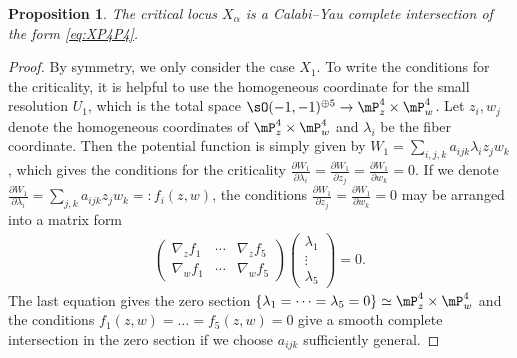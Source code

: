 \documentclass[pdftex]{sigma}
\numberwithin{equation}{section}
\newtheorem{Proposition}[Theorem]{Proposition}
\begin{document}
\begin{Proposition}The critical locus $X_{\alpha}$ is a Calabi--Yau complete intersection of the form \eqref{eq:XP4P4}.
\end{Proposition}
\begin{proof} By symmetry, we only consider the case $X_{1}$. To write the conditions for the criticality, it is helpful to use the homogeneous coordinate for the small resolution $U_{1}$, which is the total space $\sO(-1,-1)^{\oplus5}\to\mP_{z}^{4}\times\mP_{w}^{4}$. Let $z_{i},w_{j}$ denote the homogeneous coordinates of $\mP_{z}^{4}\times\mP_{w}^{4}$ and $\lambda_{i}$ be the fiber coordinate. Then the potential function is simply given by $W_{1}=\sum_{i,j,k}a_{ijk}\lambda_{i}z_{j}w_{k}$, which gives the conditions for the criticality $\frac{\partial W_{1}}{\partial\lambda_{i}}=\frac{\partial W_{1}}{\partial z_{j}}=\frac{\partial W_{1}}{\partial w_{k}}=0$. If we denote $\frac{\partial W_{1}}{\partial\lambda_{i}}=\sum_{j,k}a_{ijk}z_{j}w_{k}=:f_{i}(z,w)$, the conditions $\frac{\partial W_{1}}{\partial z_{j}}=\frac{\partial W_{1}}{\partial w_{k}}=0$ may be arranged into a matrix form
\begin{gather*}
\left(\begin{matrix}\nabla_{z}f_{1} & \cdots & \nabla_{z}f_{5}\\
\nabla_{w}f_{1} & \cdots & \nabla_{w}f_{5}
\end{matrix}\right)\left(\begin{smallmatrix}\lambda_{1}\\
\vdots\\
\lambda_{5}
\end{smallmatrix}\right)=0.
\end{gather*}
The last equation gives the zero section $\left\{ \lambda_{1}=\cdots=\lambda_{5}=0\right\} \simeq\mP_{z}^{4}\times\mP_{w}^{4}$
and the conditions $f_{1}(z,w)=\dots =f_{5}(z,w)=0$ give a smooth complete intersection in the zero section if we choose $a_{ijk}$ sufficiently
general. \end{proof}
\end{document}
